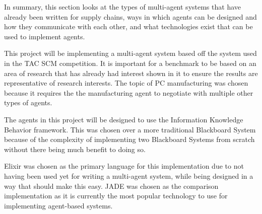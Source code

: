 In summary, this section looks at the types of multi-agent systems that have already been written for supply chains, ways in which agents can be designed and how they communicate with each other, and what technologies exist that can be used to implement agents.

This project will be implementing a multi-agent system based off the system used in the TAC SCM competition.
It is important for a benchmark to be based on an area of research that has already had interest shown in it to ensure the results are representative of research interests.
The topic of PC manufacturing was chosen because it requires the the manufacturing agent to negotiate with multiple other types of agents.

The agents in this project will be designed to use the Information Knowledge Behavior framework.
This was chosen over a more traditional Blackboard System because of the complexity of implementing two Blackboard Systems from scratch without there being much benefit to doing so.

Elixir was chosen as the primary language for this implementation due to not having been used yet for writing a multi-agent system, while being designed in a way that should make this easy.
JADE was chosen as the comparison implementation as it is currently the most popular technology to use for implementing agent-based systems.


